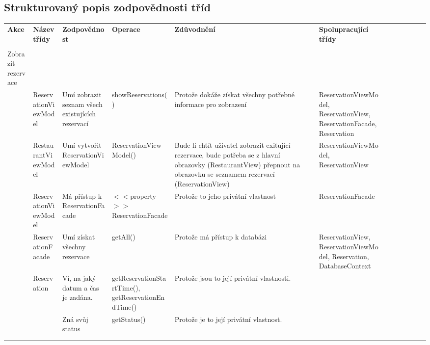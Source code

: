 \newpage
\begin{landscape}
\section*{Strukturovaný popis zodpovědnosti tříd}


\begin{longtable}{ Lp{3cm} | Lp{3.5cm} | Lp{4.5cm} | Lp{4cm} | Lp{4.5cm} | Lp{4cm} }
  	
    \textbf{Akce} & 
      \textbf{Název třídy} & \textbf{Zodpovědnost} & \textbf{Operace} & \textbf{Zdůvodnění} & \textbf{Spolupracující třídy} \\
    
    & & & & & \\
    Zobrazit rezervace & & & & & \\
    \hline
  
    & ReservationViewModel & Umí zobrazit seznam všech existujících rezervací & showReservations() & Protože dokáže získat všechny potřebné informace pro zobrazení & ReservationViewModel, ReservationView, ReservationFacade, Reservation\\
    & RestaurantViewModel & Umí vytvořit ReservationViewModel & ReservationViewModel() & Bude-li chtít uživatel zobrazit exitující rezervace, bude potřeba se z hlavní obrazovky (RestaurantView) přepnout na obrazovku se seznamem rezervací (ReservationView) & ReservationViewModel, ReservationView \\
    & ReservationViewModel & Má přístup k ReservationFacade & $<<$property$>>$ ReservationFacade & Protože to jeho privátní vlastnost & ReservationFacade \\
    & ReservationFacade & Umí získat všechny rezervace & getAll() & Protože má přístup k databázi & ReservationView, ReservationViewModel, Reservation, DatabaseContext \\
    & Reservation & Ví, na jaký datum a čas je zadána. & getReservationStartTime(), getReservationEndTime() & Protože jsou to její privátní vlastnosti. & \\
    & & Zná svůj status & getStatus() & Protože je to její privátní vlastnost. & \\
    
    
    
    & & & & & \\
    & & & & & \\
    

\end{longtable}
\end{landscape}
